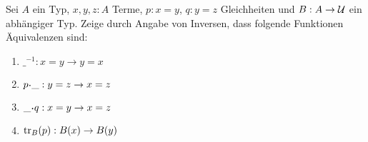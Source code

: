 \documentclass{uebung}
\begin{document}

\begin{exercise}
  Sei $A$ ein Typ, $x,y,z:A$ Terme, $p:x=y$, $q:y=z$ Gleichheiten und $B:A\to\mathcal{U}$ ein abhängiger Typ.
  Zeige durch Angabe von Inversen, dass folgende Funktionen Äquivalenzen sind:
  \begin{enumerate}
    \item $\_^{-1}:x=y\to y=x$
    \item $p\kon\_:y=z\to x=z$
    \item $\_\kon q:x=y\to x=z$
    \item $\mathrm{tr}_B(p):B(x)\to B(y)$
  \end{enumerate}
\end{exercise}
\end{document}
